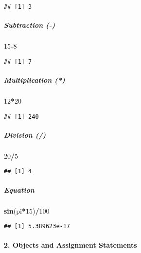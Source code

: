 \documentclass[]{article}
\newenvironment{Shaded}{\begin{snugshade}}{\end{snugshade}}
\newcommand{\KeywordTok}[1]{\textcolor[rgb]{0.13,0.29,0.53}{\textbf{#1}}}
\newcommand{\DecValTok}[1]{\textcolor[rgb]{0.00,0.00,0.81}{#1}}
\newcommand{\OperatorTok}[1]{\textcolor[rgb]{0.81,0.36,0.00}{\textbf{#1}}}
\newcommand{\NormalTok}[1]{#1}
\let\oldparagraph\paragraph
\renewcommand{\paragraph}[1]{\oldparagraph{#1}\mbox{}}
\let\oldsubparagraph\subparagraph
\renewcommand{\subparagraph}[1]{\oldsubparagraph{#1}\mbox{}}
\begin{document}
\begin{verbatim}
## [1] 3
\end{verbatim}

\subparagraph{Subtraction (-)}\label{subtraction--}

\begin{Shaded}
\begin{Highlighting}[]
\DecValTok{15}\OperatorTok{-}\DecValTok{8}
\end{Highlighting}
\end{Shaded}

\begin{verbatim}
## [1] 7
\end{verbatim}

\subparagraph{Multiplication (*)}\label{multiplication}

\begin{Shaded}
\begin{Highlighting}[]
\DecValTok{12}\OperatorTok{*}\DecValTok{20}
\end{Highlighting}
\end{Shaded}

\begin{verbatim}
## [1] 240
\end{verbatim}

\subparagraph{Division (/)}\label{division}

\begin{Shaded}
\begin{Highlighting}[]
\DecValTok{20}\OperatorTok{/}\DecValTok{5}
\end{Highlighting}
\end{Shaded}

\begin{verbatim}
## [1] 4
\end{verbatim}

\subparagraph{Equation}\label{equation}

\begin{Shaded}
\begin{Highlighting}[]
\KeywordTok{sin}\NormalTok{(pi}\OperatorTok{*}\DecValTok{15}\NormalTok{)}\OperatorTok{/}\DecValTok{100}
\end{Highlighting}
\end{Shaded}

\begin{verbatim}
## [1] 5.389623e-17
\end{verbatim}

\paragraph{2. Objects and Assignment
Statements}\label{objects-and-assignment-statements}
\end{document}

